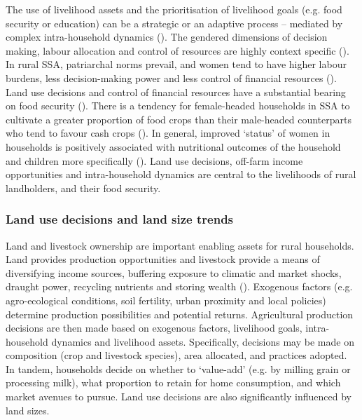 The use of livelihood assets and the prioritisation of livelihood goals (e.g. food security or education) can be a strategic or an adaptive process -- mediated by complex intra-household dynamics (\citealp{Kazianga2017, Galie2015}). The gendered dimensions of decision making, labour allocation and control of resources are highly context specific (\citealp{Doss2013}). In rural SSA, patriarchal norms prevail, and women tend to have higher labour burdens, less decision-making power and less control of financial resources (\citealp{Sofa2011}). Land use decisions and control of financial resources have a substantial bearing on food security (\citealp{Dzanku2019, Price2018, AnderssonDjurfeldt2018b}). There is a tendency for female-headed households in SSA to cultivate a greater proportion of food crops than their male-headed counterparts who tend to favour cash crops (\citealp{tibesigwa2018contribution}). In general, improved `status' of women in households is positively associated with nutritional outcomes of the household and children more specifically (\citealp{Bhandari2017, doi:10.1093/ajcn/nqy001, JIN201416}). Land use decisions, off-farm income opportunities and intra-household dynamics are central to the livelihoods of rural landholders, and their food security.

\subsubsection{Land use decisions and land size trends}

Land and livestock ownership are important enabling assets for rural households. Land provides production opportunities and livestock provide a means of diversifying income sources, buffering exposure to climatic and market shocks, draught power, recycling nutrients and storing wealth (\citealp{Thornton2015, Swanepoel2010, Moll2005, McIntire1992}). Exogenous factors (e.g. agro-ecological conditions, soil fertility, urban proximity and local policies) determine production possibilities and potential returns. Agricultural production decisions are then made based on exogenous factors, livelihood goals, intra-household dynamics and livelihood assets. Specifically, decisions may be made on composition (crop and livestock species), area allocated, and practices adopted. In tandem, households decide on whether to `value-add' (e.g. by milling grain or processing milk), what proportion to retain for home consumption, and which market avenues to pursue. Land use decisions are also significantly influenced by land sizes.

